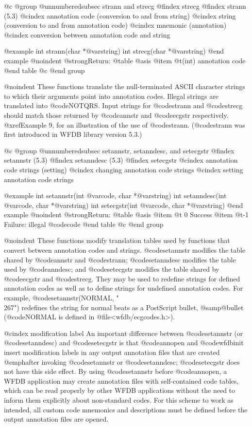 {{{{{{{{@c @group
@unnumberedsubsec strann and strecg
@findex strecg
@findex strann (5.3)
@cindex annotation code (conversion to and from string)
@cindex string (conversion to and from annotation code)
@cindex mnemonic (annotation)
@cindex conversion between annotation code and string

@example
int strann(char *@var{string})
int strecg(char *@var{string})
@end example
@noindent
@strong{Return:}
@table @asis
@item @t{(int)}
annotation code
@end table
@c @end group

@noindent
These functions translate the null-terminated ASCII character strings to
which their arguments point into annotation codes.  Illegal strings are
translated into @code{NOTQRS}.  Input strings for @code{strann} and
@code{strecg} should match those returned by @code{annstr} and
@code{ecgstr} respectively.  @xref{Example 9}, for an illustration of the
use of @code{strann}. (@code{strann} was first introduced in WFDB library
version 5.3.)

@c @group
@unnumberedsubsec setannstr, setanndesc, and setecgstr
@findex setannstr (5.3)
@findex setanndesc (5.3)
@findex setecgstr
@cindex annotation code strings (setting)
@cindex changing annotation code strings
@cindex setting annotation code strings

@example
int setannstr(int @var{code}, char *@var{string})
int setanndesc(int @var{code}, char *@var{string})
int setecgstr(int @var{code}, char *@var{string})
@end example
@noindent
@strong{Return:}
@table @asis
@item @t{ 0}
Success
@item @t{-1}
Failure: illegal @code{code}
@end table
@c @end group

@noindent
These functions modify translation tables used by functions that
convert between annotation codes and strings.  @code{setannstr} modifies
the table shared by @code{annstr} and @code{strann}; @code{setanndesc}
modifies the table used by @code{anndesc}; and @code{setecgstr} modifies
the table shared by @code{ecgstr} and @code{strecg}.  They may be used
to redefine strings for defined annotation codes as well as to define
strings for undefined annotation codes.  For example,
@code{setannstr(NORMAL, "\\267")} redefines the string for normal beats
as a PostScript bullet, @samp{@bullet{}} (@code{NORMAL} is defined in
@file{<wfdb/ecgcodes.h>}).

@cindex modification label
An important difference between @code{setannstr} (or @code{setanndesc})
and @code{setecgstr} is that @code{annopen} and @code{wfdbinit} insert
modification labels in any output annotation files that are created
@emph{after} invoking @code{setannstr} or @code{setanndesc};
@code{setecgstr} does not have this side effect.  By using
@code{setannstr} before @code{annopen}, a WFDB application may create
annotation files with self-contained code tables, which can be read
properly by other WFDB applications without the need to inform them
explicitly about non-standard codes.  For this scheme to work as
intended, all custom code mnemonics and descriptions must be defined
before the output annotation files are opened.

}}}}}}}}
